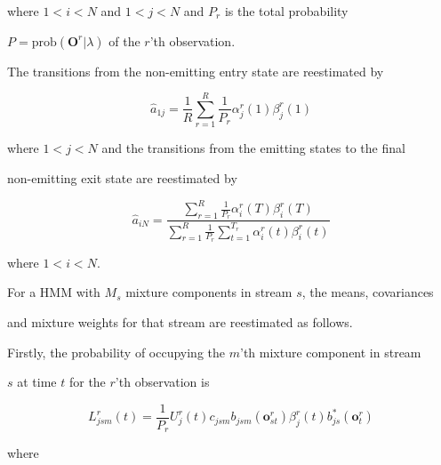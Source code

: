 where $1<i<N$ and $1<j<N$ and $P_r$ is the total probability


$P = \mbox{prob}(\bm{O}^r | \lambda)$ of the $r$'th observation.  


The transitions from the non-emitting entry state are reestimated by


\[


   \hat{a}_{1j} = \frac{1}{R} 


                  \sum_{r=1}^R \frac{1}{P_r}


                  \alpha^r_j(1) \beta^r_j(1)


\]


where $1<j<N$ and the transitions from the emitting states to the final


non-emitting exit state are reestimated by


\[   


   \hat{a}_{iN} = \frac{


                  \sum_{r=1}^R \frac{1}{P_r}


                  \alpha^r_i(T)\beta^r_i(T)


                    }{


                  \sum_{r=1}^R \frac{1}{P_r}


                  \sum_{t=1}^{T_r}


                  \alpha^r_i(t)\beta^r_i(t)


                    }


\]


where $1<i<N$.





For a HMM with $M_s$ mixture components in stream $s$, the means, covariances


and mixture weights for that stream are reestimated as follows.


Firstly, the probability of occupying the $m$'th mixture component in stream


$s$ at time $t$ for the $r$'th observation is


\[


  L^r_{jsm}(t) = \frac{1}{P_r} U^r_j(t) c_{jsm} b_{jsm}(\bm{o}^r_{st})


                  \beta^r_j(t) b^*_{js}(\bm{o}^r_t)


\]


where




